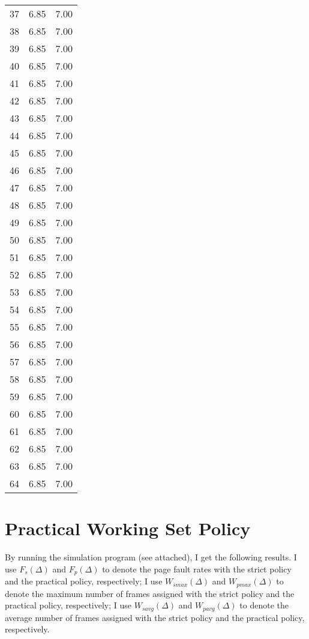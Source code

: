 \documentclass[12pt,letterpaper]{article}
\begin{document}
\begin{center}
\begin{longtable}{r|r|r}
37 & 6.85 & 7.00\\
38 & 6.85 & 7.00\\
39 & 6.85 & 7.00\\
40 & 6.85 & 7.00\\
41 & 6.85 & 7.00\\
42 & 6.85 & 7.00\\
43 & 6.85 & 7.00\\
44 & 6.85 & 7.00\\
45 & 6.85 & 7.00\\
46 & 6.85 & 7.00\\
47 & 6.85 & 7.00\\
48 & 6.85 & 7.00\\
49 & 6.85 & 7.00\\
50 & 6.85 & 7.00\\
51 & 6.85 & 7.00\\
52 & 6.85 & 7.00\\
53 & 6.85 & 7.00\\
54 & 6.85 & 7.00\\
55 & 6.85 & 7.00\\
56 & 6.85 & 7.00\\
57 & 6.85 & 7.00\\
58 & 6.85 & 7.00\\
59 & 6.85 & 7.00\\
60 & 6.85 & 7.00\\
61 & 6.85 & 7.00\\
62 & 6.85 & 7.00\\
63 & 6.85 & 7.00\\
64 & 6.85 & 7.00\\
\end{longtable}
\end{center}

\section{Practical Working Set Policy}
By running the simulation program (see attached), I get the following results. I use $F_s(\Delta)$ and $F_p(\Delta)$ to denote the page fault rates with the strict policy and the practical policy, respectively; I use $W_{smax}(\Delta)$ and $W_{pmax}(\Delta)$ to denote the maximum number of frames assigned with the strict policy and the practical policy, respectively; I use $W_{savg}(\Delta)$ and $W_{pavg}(\Delta)$ to denote the average number of frames assigned with the strict policy and the practical policy, respectively.
\end{document}
